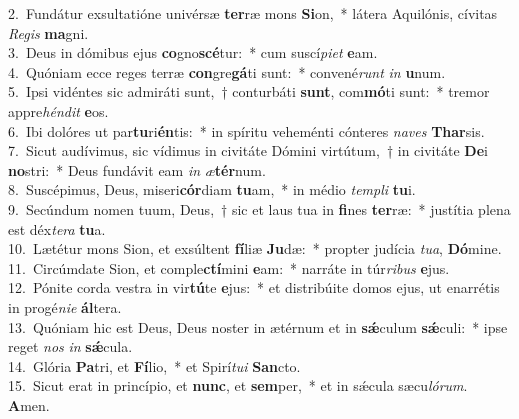 {2.~}Fundátur exsultatióne univérsæ \textbf{ter}ræ mons \textbf{Si}on,~* látera Aquilónis, cívitas \textit{Re}\textit{gis} \textbf{ma}gni.\\
{3.~}Deus in dómibus ejus \textbf{co}gno\textbf{scé}tur:~* cum suscí\textit{pi}\textit{et} \textbf{e}am.\\
{4.~}Quóniam ecce reges terræ \textbf{con}gre\textbf{gá}ti sunt:~* convené\textit{runt} \textit{in} \textbf{u}num.\\
{5.~}Ipsi vidéntes sic admiráti sunt,~† conturbáti \textbf{sunt}, com\textbf{mó}ti sunt:~* tremor appre\textit{hén}\textit{dit} \textbf{e}os.\\
{6.~}Ibi dolóres ut par\textbf{tu}ri\textbf{én}tis:~* in spíritu veheménti cónteres \textit{na}\textit{ves} \textbf{Thar}sis.\\
{7.~}Sicut audívimus, sic vídimus in civitáte Dómini virtútum,~† in civitáte \textbf{De}i \textbf{no}stri:~* Deus fundávit eam \textit{in} \textit{æ}\textbf{tér}num.\\
{8.~}Suscépimus, Deus, miseri\textbf{cór}diam \textbf{tu}am,~* in médio \textit{tem}\textit{pli} \textbf{tu}i.\\
{9.~}Secúndum nomen tuum, Deus,~† sic et laus tua in \textbf{fi}nes \textbf{ter}ræ:~* justítia plena est déx\textit{te}\textit{ra} \textbf{tu}a.\\
{10.~}Lætétur mons Sion, et exsúltent \textbf{fí}liæ \textbf{Ju}dæ:~* propter judícia \textit{tu}\textit{a}, \textbf{Dó}mine.\\
{11.~}Circúmdate Sion, et comple\textbf{ctí}mini \textbf{e}am:~* narráte in túr\textit{ri}\textit{bus} \textbf{e}jus.\\
{12.~}Pónite corda vestra in vir\textbf{tú}te \textbf{e}jus:~* et distribúite domos ejus, ut enarrétis in progé\textit{ni}\textit{e} \textbf{ál}tera.\\
{13.~}Quóniam hic est Deus, Deus noster in ætérnum et in \textbf{sǽ}culum \textbf{sǽ}culi:~* ipse reget \textit{nos} \textit{in} \textbf{sǽ}cula.\\
{14.~}Glória \textbf{Pa}tri, et \textbf{Fí}lio,~* et Spirí\textit{tu}\textit{i} \textbf{San}cto.\\
{15.~}Sicut erat in princípio, et \textbf{nunc}, et \textbf{sem}per,~* et in sǽcula sæcu\textit{ló}\textit{rum}. \textbf{A}men.\\
